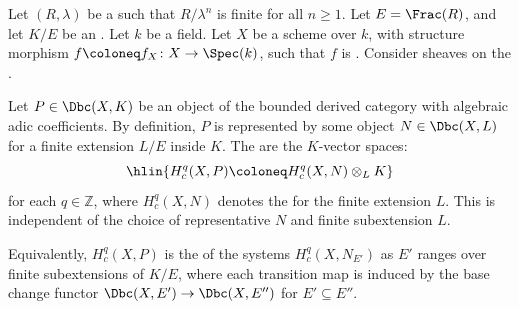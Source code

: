 \begin{definition} \label{definition:compactly_supported_lambda_adic_cohomology_groups_with_algebraic_coefficients_on_a_noetherian_scheme}
    Let $(R, \lambda)$ be a   such that $R/\lambda^n$ is finite for all $n \geq 1$. Let $E = \Frac(R)$, and let $K/E$ be an . Let $k$ be a field. Let $X$ be a  scheme over $k$, with structure morphism $f \coloneq f_X \colon X \to \Spec(k)$, such that $f$ is . Consider sheaves on the .

    Let $P \in \Dbc(X, K)$ be an object of the bounded derived category with algebraic adic coefficients. By definition, $P$ is represented by some object $N \in \Dbc(X, L)$ for a finite extension $L/E$ inside $K$. The  are the $K$-vector spaces:
    $$\hlin{H_c^q(X, P) \coloneq H_c^q(X, N) \otimes_L K}$$
    for each $q \in \mathbb{Z}$, where $H_c^q(X, N)$ denotes the  for the finite extension $L$. This is independent of the choice of representative $N$ and finite subextension $L$.

    Equivalently, $H_c^q(X, P)$ is the  of the systems $H_c^q(X, N_{E'})$ as $E'$ ranges over finite subextensions of $K/E$, where each transition map is induced by the base change functor $\Dbc(X, E') \to \Dbc(X, E'')$ for $E' \subseteq E''$.
\end{definition}
